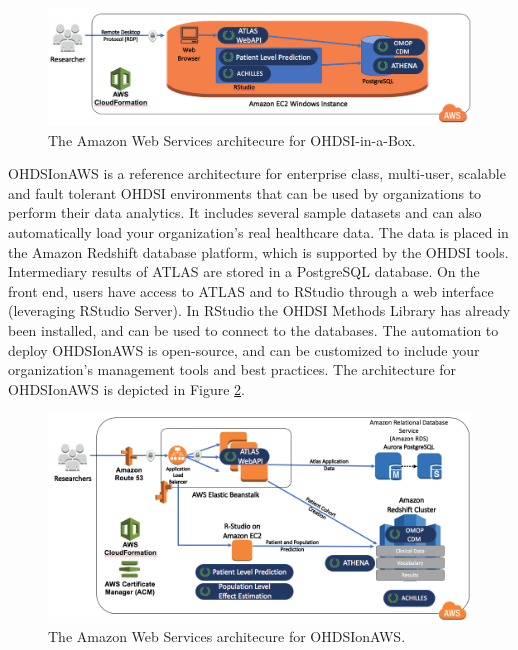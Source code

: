 \documentclass[11pt]{book}
\theoremstyle{definition}
\theoremstyle{definition}
\theoremstyle{definition}
\theoremstyle{remark}
\begin{document}
\begin{figure}

{\centering \includegraphics[width=1\linewidth]{images/OhdsiAnalyticsTools/OHDSI-in-a-BoxDiagram} 

}

\caption{The Amazon Web Services architecure for OHDSI-in-a-Box.}\label{fig:ohdsiinaboxDiagram}
\end{figure}

OHDSIonAWS is a reference architecture for enterprise class, multi-user, scalable and fault tolerant OHDSI environments that can be used by organizations to perform their data analytics. It includes several sample datasets and can also automatically load your organization's real healthcare data. The data is placed in the Amazon Redshift database platform, which is supported by the OHDSI tools. Intermediary results of ATLAS are stored in a PostgreSQL database. On the front end, users have access to ATLAS and to RStudio through a web interface (leveraging RStudio Server). In RStudio the OHDSI Methods Library has already been installed, and can be used to connect to the databases. The automation to deploy OHDSIonAWS is open-source, and can be customized to include your organization's management tools and best practices. The architecture for OHDSIonAWS is depicted in Figure \ref{fig:ohdsionawsDiagram}.

\begin{figure}

{\centering \includegraphics[width=1\linewidth]{images/OhdsiAnalyticsTools/OHDSIonAWSDiagram} 

}

\caption{The Amazon Web Services architecure for OHDSIonAWS.}\label{fig:ohdsionawsDiagram}
\end{figure}
\end{document}
